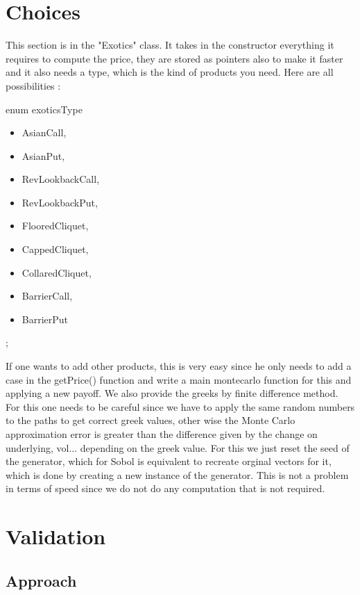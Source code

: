 \section{Choices}
This section is in the "Exotics" class. It takes in the constructor everything it requires to compute the price, they are stored as pointers also 
to make it faster and it also needs a type, which is the kind of products you need.
Here are all possibilities :

enum exoticsType {
\begin{itemize}
	\item AsianCall,
	\item AsianPut,
	\item RevLookbackCall,
	\item RevLookbackPut,
	\item FlooredCliquet,
	\item CappedCliquet,
	\item CollaredCliquet,
	\item BarrierCall,
	\item BarrierPut
\end{itemize}
};	

If one wants to add other products, this is very easy since he only needs to add a case in the getPrice() function and write a main montecarlo function for this and applying a new payoff.
We also provide the greeks by finite difference method. For this one needs to be careful 
since we have to apply the same random numbers to the paths to get correct greek values, other wise the 
Monte Carlo approximation error is greater than the difference given by the change on underlying, vol... depending on 
the greek value. For this we just reset the seed of the generator, which for Sobol is equivalent to recreate orginal 
vectors for it, which is done by creating a new instance of the generator. This is not a 
problem in terms of speed since we do not do any computation that is not required.



\section{Validation}


\subsection{Approach}

